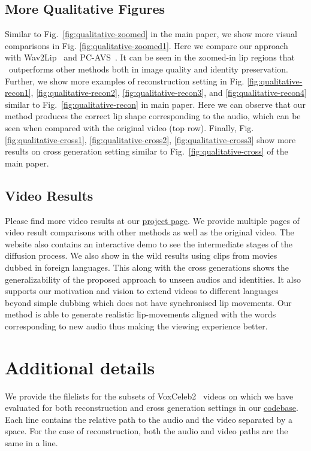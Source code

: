 \subsection{More Qualitative Figures}
Similar to Fig.~\ref{fig:qualitative-zoomed} in the main paper, we show more visual comparisons in Fig. \ref{fig:qualitative-zoomed1}. Here we compare our approach with Wav2Lip~\cite{wav2lip} and PC-AVS~\cite{pcavs}. It can be seen in the zoomed-in lip regions that \ours~outperforms other methods both in image quality and identity preservation. Further, we show more examples of reconstruction setting in Fig. \ref{fig:qualitative-recon1}, \ref{fig:qualitative-recon2}, \ref{fig:qualitative-recon3}, and \ref{fig:qualitative-recon4} similar to Fig.~\ref{fig:qualitative-recon} in main paper. Here we can observe that our method produces the correct lip shape corresponding to the audio, which can be seen when compared with the original video (top row). Finally, Fig. \ref{fig:qualitative-cross1},  \ref{fig:qualitative-cross2},  \ref{fig:qualitative-cross3} show more results on cross generation setting similar to Fig.~\ref{fig:qualitative-cross} of the main paper. 

\subsection{Video Results}
Please find more video results at our \href{https://soumik-kanad.github.io/diff2lip}{project page}. 
We provide multiple pages of video result comparisons with other methods as well as the original video. The website also contains an interactive demo to see the intermediate stages of the diffusion process. We also show in the wild results using clips from movies dubbed in foreign languages. This along with the cross generations shows the generalizability of the proposed approach to unseen audios and identities. It also supports our motivation and vision to extend videos to different languages beyond simple dubbing which does not have synchronised lip movements. Our method is able to generate realistic lip-movements aligned with the words corresponding to new audio thus making the viewing experience better.

\section{Additional details}

We provide the filelists for the subsets of VoxCeleb2~\cite{voxceleb2} videos on which we have evaluated for both reconstruction and cross generation settings in our \href{https://github.com/soumik-kanad/diff2lip}{codebase}. Each line contains the relative path to the audio and the video separated by a space. For the case of reconstruction, both the audio and video paths are the same in a line. 

